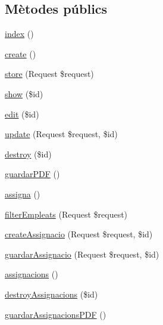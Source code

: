 \subsection*{Mètodes públics}
\begin{DoxyCompactItemize}
\item 
\mbox{\hyperlink{class_app_1_1_http_1_1_controllers_1_1_atraccions_controller_a149eb92716c1084a935e04a8d95f7347}{index}} ()
\item 
\mbox{\hyperlink{class_app_1_1_http_1_1_controllers_1_1_atraccions_controller_a435e7d7525d4bcd0ed5e34a469f3adf6}{create}} ()
\item 
\mbox{\hyperlink{class_app_1_1_http_1_1_controllers_1_1_atraccions_controller_a9ef485163104597c12185b53cdacf638}{store}} (Request \$request)
\item 
\mbox{\hyperlink{class_app_1_1_http_1_1_controllers_1_1_atraccions_controller_ae4914d07a9bbe4aede7a5dea759f6287}{show}} (\$id)
\item 
\mbox{\hyperlink{class_app_1_1_http_1_1_controllers_1_1_atraccions_controller_a459ed16587e3a50b39b672c7e473abc5}{edit}} (\$id)
\item 
\mbox{\hyperlink{class_app_1_1_http_1_1_controllers_1_1_atraccions_controller_affb03cc19897a1800a0f411264d6c7cc}{update}} (Request \$request, \$id)
\item 
\mbox{\hyperlink{class_app_1_1_http_1_1_controllers_1_1_atraccions_controller_a726fa8a4b4b187b9ca32ba427aac8137}{destroy}} (\$id)
\item 
\mbox{\hyperlink{class_app_1_1_http_1_1_controllers_1_1_atraccions_controller_a15b182859a6f69befac8a7d983464743}{guardar\+P\+DF}} ()
\item 
\mbox{\hyperlink{class_app_1_1_http_1_1_controllers_1_1_atraccions_controller_aed6d272f8d9aa849301c5f5f4d6e57af}{assigna}} ()
\item 
\mbox{\hyperlink{class_app_1_1_http_1_1_controllers_1_1_atraccions_controller_a24cef5f7d055e7a8a2a174c3eb4e0aa4}{filter\+Empleats}} (Request \$request)
\item 
\mbox{\hyperlink{class_app_1_1_http_1_1_controllers_1_1_atraccions_controller_a14bd114ea4d1a4bd85f93481042d85b5}{create\+Assignacio}} (Request \$request, \$id)
\item 
\mbox{\hyperlink{class_app_1_1_http_1_1_controllers_1_1_atraccions_controller_ab799346e457ec40f7dc74d6c1383d1e5}{guardar\+Assignacio}} (Request \$request, \$id)
\item 
\mbox{\hyperlink{class_app_1_1_http_1_1_controllers_1_1_atraccions_controller_a8c67bd00a2c6244cf7786e9ee7463e4b}{assignacions}} ()
\item 
\mbox{\hyperlink{class_app_1_1_http_1_1_controllers_1_1_atraccions_controller_a53e470f5fa0e3c43cbde089161e7c6cd}{destroy\+Assignacions}} (\$id)
\item 
\mbox{\hyperlink{class_app_1_1_http_1_1_controllers_1_1_atraccions_controller_ad7545c0f1cd2a3b25c6a2a4253c36e0b}{guardar\+Assignacions\+P\+DF}} ()
\end{DoxyCompactItemize}


